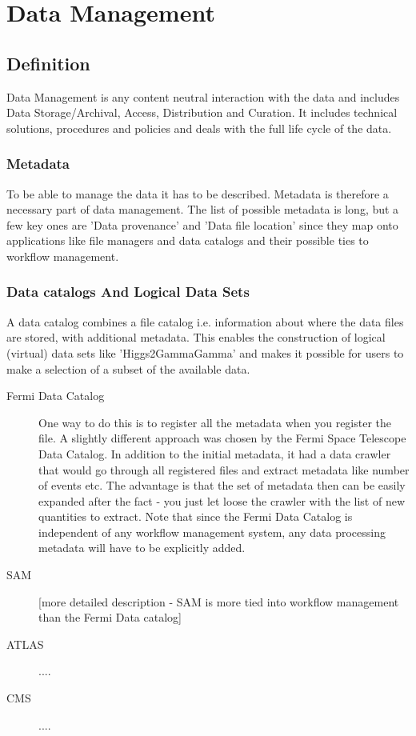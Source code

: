 \section{Data Management}
\label{data}


\subsection{Definition}
Data Management is any content neutral interaction with the data and includes Data Storage/Archival, Access, 
Distribution and Curation. It includes technical solutions, procedures and policies and deals with the full life 
cycle of the data. 



\subsubsection{Metadata}
To be able to manage the data it has to be described. Metadata is therefore a necessary part of data management. The 
list of possible metadata is long, but a few key ones are 'Data provenance' and 'Data file location' since they map onto 
applications like file managers and data catalogs and their possible ties to workflow management.

\subsubsection{Data catalogs And Logical Data Sets}
A data catalog combines a file catalog i.e. information about where the data files are stored, with additional metadata.
This enables the construction of logical (virtual) data sets like 'Higgs2GammaGamma' and makes it possible for users to 
make a selection of a subset of the available data.

\begin{description}
\item[Fermi Data Catalog] One way to do this is to register all the metadata when you register the file. A slightly
different approach was chosen by the Fermi Space Telescope Data Catalog. In addition to the initial metadata, it had a
data crawler that would go through all registered files and extract metadata like number of events etc. The advantage is
that the set of metadata then can be easily expanded after the fact - you just let loose the crawler with the list
of new quantities to extract. Note that since the Fermi Data Catalog is independent of any workflow management system, 
any data processing metadata will have to be explicitly added. 


\item[SAM] [more detailed description - SAM is more tied into workflow management than the Fermi Data catalog]

\item[ATLAS] ....

\item[CMS] ....

\end{description}



